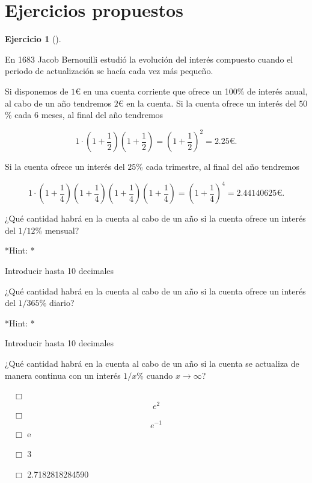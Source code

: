 \documentclass[
  a4paper,
]{scrreport}
\theoremstyle{definition}
\newtheorem{exercise}{Ejercicio}[chapter]
\theoremstyle{remark}
\begin{document}
\hypertarget{ejercicios-propuestos-2}{%
\section{Ejercicios propuestos}\label{ejercicios-propuestos-2}}

\leavevmode{}%
\begin{exercise}[]\label{exr-interes-compuesto}

En 1683 Jacob Bernouilli estudió la evolución del interés compuesto
cuando el periodo de actualización se hacía cada vez más pequeño.

Si disponemos de \(1\)€ en una cuenta corriente que ofrece un 100\% de
interés anual, al cabo de un año tendremos \(2\)€ en la cuenta. Si la
cuenta ofrece un interés del \(50\)\% cada 6 meses, al final del año
tendremos

\[
1\cdot\left(1+\frac{1}{2}\right)\left(1+\frac{1}{2}\right)= \left(1+\frac{1}{2}\right)^2 = 2.25\mbox{€}.
\]

Si la cuenta ofrece un interés del \(25\)\% cada trimestre, al final del
año tendremos

\[
1\cdot\left(1+\frac{1}{4}\right)\left(1+\frac{1}{4}\right)\left(1+\frac{1}{4}\right)\left(1+\frac{1}{4}\right)= \left(1+\frac{1}{4}\right)^4 = 2.44140625\mbox{€}.
\]

¿Qué cantidad habrá en la cuenta al cabo de un año si la cuenta ofrece
un interés del \(1/12\)\% mensual?

\vspace{18pt}*Hint: *

Introducir hasta 10 decimales

¿Qué cantidad habrá en la cuenta al cabo de un año si la cuenta ofrece
un interés del \(1/365\)\% diario?

\vspace{18pt}*Hint: *

Introducir hasta 10 decimales

¿Qué cantidad habrá en la cuenta al cabo de un año si la cuenta se
actualiza de manera continua con un interés \(1/x\)\% cuando
\(x\to\infty\)?

${\quad\Box}$ $$e^2$$
${\quad\Box}$ $$e^{-1}$$
${\quad\Box}$ e

${\quad\Box}$ 3

${\quad\Box}$ 2.7182818284590

\end{exercise}
\end{document}
